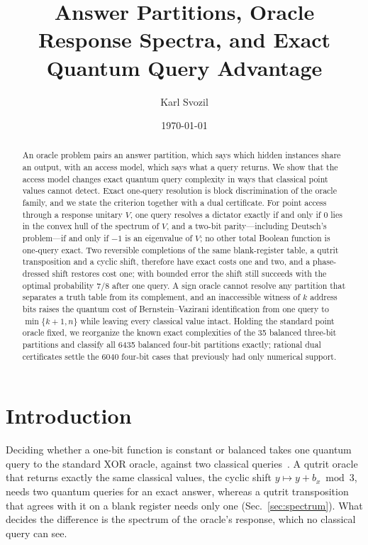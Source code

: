 \documentclass[
  aps,
  pra,
  reprint,
  nofootinbib
]{revtex4-2}
\begin{document}
\title{Answer Partitions, Oracle Response Spectra, and Exact Quantum Query Advantage}

\author{Karl Svozil }

\date{\today}

\begin{abstract}
An oracle problem pairs an answer partition, which says which hidden instances
share an output, with an access model, which says what a query returns. We show
that the access model changes exact quantum query complexity in ways that
classical point values cannot detect. Exact one-query resolution is block
discrimination of the oracle family, and we state the criterion together with a
dual certificate. For point access through a response unitary \(V\), one query
resolves a dictator exactly if and only if \(0\) lies in the convex hull of the
spectrum of \(V\), and a two-bit parity---including Deutsch's problem---if and
only if \(-1\) is an eigenvalue of \(V\); no other total Boolean function is
one-query exact. Two
reversible completions of the same blank-register table, a qutrit
transposition and a cyclic shift, therefore have exact costs one and two, and a
phase-dressed shift restores cost one; with bounded error the shift still
succeeds with the optimal probability \(7/8\) after one query. A sign oracle
cannot resolve any partition that separates a truth table from its complement,
and an inaccessible witness of \(k\) address bits raises the quantum cost of
Bernstein--Vazirani identification from one query to \(\min\{k+1,n\}\) while
leaving every classical value intact. Holding the standard point oracle fixed,
we reorganize the known exact complexities of the 35 balanced three-bit
partitions and classify all 6435 balanced four-bit partitions exactly; rational
dual certificates settle the 6040 four-bit cases that previously had only
numerical support.
\end{abstract}

\maketitle

\section{Introduction}

Deciding whether a one-bit function is constant or balanced takes one quantum
query to the standard XOR oracle, against two classical
queries~\cite{deutsch,deutsch:92,cleve:98}. A qutrit oracle that returns
exactly the same classical values, the cyclic shift \(y\mapsto y+b_x\bmod 3\),
needs two quantum queries for an exact answer, whereas a qutrit transposition
that agrees with it on a blank register needs only one
(Sec.~\ref{sec:spectrum}). What decides the difference is the spectrum of the
oracle's response, which no classical query can see.
\end{document}
